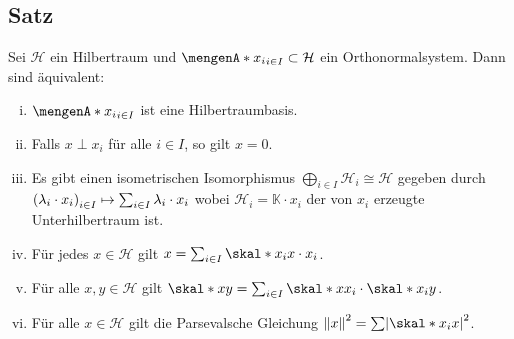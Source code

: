 \subsection[Satz über Äquivalenzen zu: $\set{x_i}_{i \in I}$ ist eine Hilbertraumbasis]{Satz} %
\label{sub:722}
Sei $\mathcal{H}$ ein Hilbertraum und $\set{x_i}_{i \in I} \subset \mathcal{H}$ ein Orthonormalsystem. Dann sind äquivalent: 
\begin{enumerate}[(i)]
	\item $\set{x_i}_{i \in I}$ ist eine Hilbertraumbasis. 
	\item Falls $x \perp x_i$ für alle $i \in I$, so gilt $x=0$.
	\item Es gibt einen isometrischen Isomorphismus $\bigoplus_{i \in I} \mathcal{H}_i \cong \mathcal{H}$ gegeben durch 
	\(
		\enbrace*{\lambda_i \cdot x_i}_{i \in I} \mapsto \sum_{i \in I} \lambda_i \cdot x_i 
	\)
	wobei $\mathcal{H}_i = \mathds{K} \cdot x_i$ der von $x_i$ erzeugte Unterhilbertraum ist.
	\item Für jedes $x \in \mathcal{H}$ gilt $x= \sum_{i \in I} \skal*{x_i}{x} \cdot x_i$.
	\item Für alle $x,y \in \mathcal{H}$ gilt $\skal*{x}{y} = \sum_{i \in I} \skal*{x}{x_i} \cdot \skal*{x_i}{y}$.
	\item Für alle $x \in \mathcal{H}$ gilt die Parsevalsche Gleichung $\norm{x}^2 = \sum \abs*{\skal*{x_i}{x}}^2$.
\end{enumerate}
